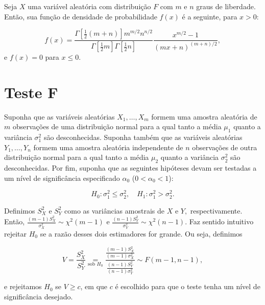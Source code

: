 \documentclass[12pt]{beamer}
\begin{document}
\begin{frame}{}
\begin{block}{}
\justifying
Seja $X$ uma variável aleatória com distribuição $F$ com $m$ e $n$ graus de liberdade. Então, sua função de densidade de probabilidade $f(x)$ é a seguinte, para $x > 0:$

\[
f(x) = \dfrac{\Gamma\left[\frac{1}{2}(m+n)\right]m^{m/2}n^{n/2}}{\Gamma\left[\frac{1}{2}m\right]\Gamma\left[\frac{1}{2}n\right]}\dfrac{x^{m/2}-1}{(mx+n)^{(m+n)/2}},
\]
e $f(x) = 0$ para $x \leq 0.$

\end{block}
\end{frame}

\section{Teste F}
\begin{frame}{}
\begin{block}{}
\justifying
Suponha que as variáveis aleatórias $X_1, \ldots, X_m$ formem uma amostra aleatória de $m$ observações de uma distribuição normal para a qual tanto a média $\mu_1$ quanto a variância $\sigma^2_1$ são desconhecidas. Suponha também que as variáveis aleatórias $Y_1, \ldots, Y_n$ formem uma amostra aleatória independente de $n$ observações de outra distribuição normal para a qual tanto a média $\mu_2$ quanto a variância $\sigma^2_2$ são desconhecidas. Por fim, suponha que as seguintes hipóteses devam ser testadas a um nível de significância especificado $\alpha_0$ ($0 < \alpha_0 < 1$):

\[
H_0: \sigma^2_1 \leq \sigma^2_2, \quad H_1: \sigma^2_1 > \sigma^2_2.
\]
\end{block}
\end{frame}

\begin{frame}{}
\begin{block}{}
\justifying
Definimos $S^2_X$ e $S^2_Y$ como as variâncias amostrais de $X$ e $Y,$ respectivamente. Então, $\frac{(m - 1)S^2_{X}}{\sigma^{2}_{X}}\sim \chi^{2}(m-1)$ e $\frac{(n - 1)S^2_{Y}}{\sigma^{2}_{Y}}\sim \chi^{2}(n-1).$ Faz sentido intuitivo rejeitar $H_0$ se a razão desses dois estimadores for grande. Ou seja, definimos

\[
V =\dfrac{S^{2}_{X}}{S^{2}_{Y}} \underset{\text{sob } H_0}{=}  \dfrac{\frac{(m - 1)S^2_{X}}{(m-1)\sigma^{2}_{X}}}{\frac{(n - 1)S^2_{Y}}{(n-1)\sigma^{2}_{Y}}}\sim F(m-1,n-1),
\]

e rejeitamos $H_0$ se $V \geq c$, em que $c$ é escolhido para que o teste tenha um nível de significância desejado.

\end{block}
\end{frame}
\end{document}
